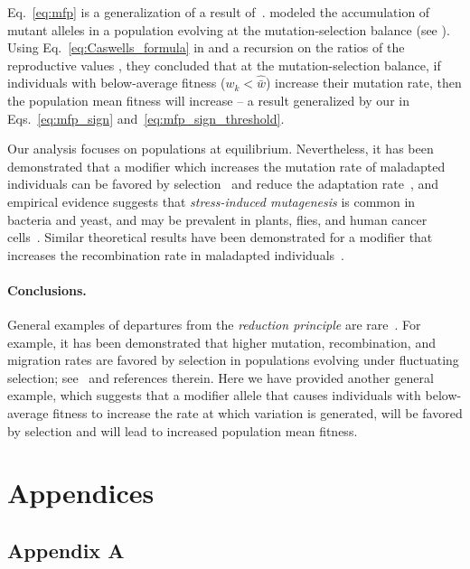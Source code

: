 \documentclass[9pt, a4paper, twocolumn]{extarticle}
\begin{document}
Eq.~\ref{eq:mfp} is a generalization of a result of~\citet[Eq.~4]{Ram2012}.
\citeauthor{Ram2012} modeled the accumulation of mutant alleles in a population evolving at the mutation-selection balance (see ).
Using Eq.~\ref{eq:Caswells_formula} in  and a recursion on the ratios of the reproductive values \cite[see][eqs.~A5-6]{Ram2012}, they concluded that at the mutation-selection balance, if individuals with below-average fitness ($w_k < \hat{\bar w}$) increase their mutation rate, then the population mean fitness will increase -- a result generalized by our \emph{} in Eqs.~\ref{eq:mfp_sign} and~\ref{eq:mfp_sign_threshold}.

Our analysis focuses on populations at equilibrium.
Nevertheless, it has been demonstrated that a modifier which increases the mutation rate of maladapted individuals can be favored by selection~\citep{Ram2012} and reduce the adaptation rate~\citep{Ram2014},
and empirical evidence suggests that \emph{stress-induced mutagenesis} is common in bacteria and yeast, and may be prevalent in plants, flies, and human cancer cells~\citep{Rosenberg2012,Fitzgerald2017b}.
Similar theoretical results have been demonstrated for a modifier that increases the recombination rate in maladapted individuals~\citep{Hadany2003b,Hadany2003a}.

\paragraph*{Conclusions.}

General examples of departures from the \emph{reduction principle} are rare~\citep{Altenberg2017}.
For example, it has been demonstrated that higher mutation, recombination, and migration rates are favored by selection in populations evolving under fluctuating selection; see~\citet{Carja2014} and references therein.
Here we have provided another general example, which suggests that a modifier allele that causes individuals with below-average fitness to increase the rate at which variation is generated, will be favored by selection and will lead to increased population mean fitness.

\section*{Appendices}

\subsection*{Appendix A}\label{sec:AppA}
\end{document}
